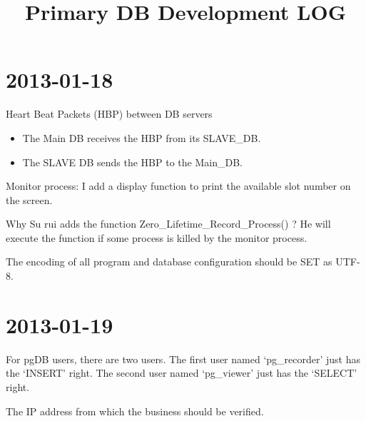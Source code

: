 \documentclass[12pt]{YzwReadingEN} %
\title{Primary DB Development LOG}
\begin{document}
\maketitle
\section{2013-01-18}
{Heart Beat Packets (HBP) between DB servers}
\begin{itemize}
\item The Main DB receives the HBP from its SLAVE\_DB.
\item The SLAVE DB sends the HBP to the Main\_DB.
\end{itemize}


Monitor process:
I add a display function to print the available slot number on the screen.

Why Su rui adds the function Zero\_Lifetime\_Record\_Process() ?
He will execute the function if some process is killed by the monitor process.

The encoding of all program and database configuration should be SET as UTF-8.

\section{2013-01-19}
For pgDB users, there are two users. The first user named `pg\_recorder' just has the `INSERT' right. 
The second user named `pg\_viewer' just has the `SELECT' right.

The IP address from which the business should be verified.
\end{document}
